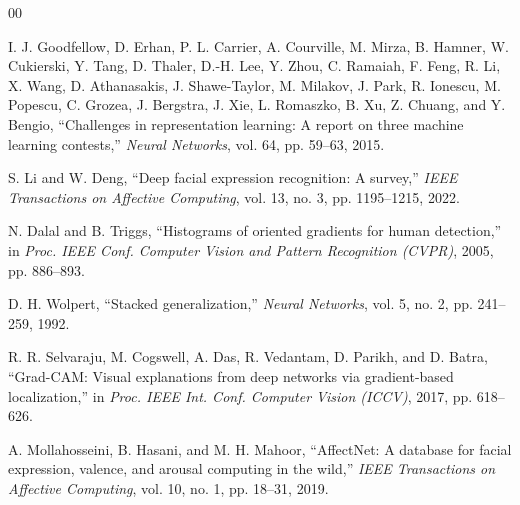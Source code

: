 \documentclass[conference]{IEEEtran}
\begin{document}
\begin{thebibliography}{00}

I. J. Goodfellow, D. Erhan, P. L. Carrier, A. Courville, M. Mirza,
B. Hamner, W. Cukierski, Y. Tang, D. Thaler, D.-H. Lee, Y. Zhou,
C. Ramaiah, F. Feng, R. Li, X. Wang, D. Athanasakis, J. Shawe-Taylor,
M. Milakov, J. Park, R. Ionescu, M. Popescu, C. Grozea, J. Bergstra,
J. Xie, L. Romaszko, B. Xu, Z. Chuang, and Y. Bengio,
``Challenges in representation learning: A report on three machine learning
contests,'' \emph{Neural Networks}, vol. 64, pp. 59--63, 2015.

S. Li and W. Deng, ``Deep facial expression recognition: A survey,''
\emph{IEEE Transactions on Affective Computing}, vol. 13, no. 3,
pp. 1195--1215, 2022.

N. Dalal and B. Triggs, ``Histograms of oriented gradients for human
detection,'' in \emph{Proc. IEEE Conf. Computer Vision and Pattern Recognition
(CVPR)}, 2005, pp. 886--893.

D. H. Wolpert, ``Stacked generalization,'' \emph{Neural Networks}, vol. 5,
no. 2, pp. 241--259, 1992.

R. R. Selvaraju, M. Cogswell, A. Das, R. Vedantam, D. Parikh, and D. Batra,
``Grad-CAM: Visual explanations from deep networks via gradient-based
localization,'' in \emph{Proc. IEEE Int. Conf. Computer Vision (ICCV)}, 2017,
pp. 618--626.

A. Mollahosseini, B. Hasani, and M. H. Mahoor, ``AffectNet: A database for
facial expression, valence, and arousal computing in the wild,''
\emph{IEEE Transactions on Affective Computing}, vol. 10, no. 1, pp. 18--31,
2019.

\end{thebibliography}
\end{document}
